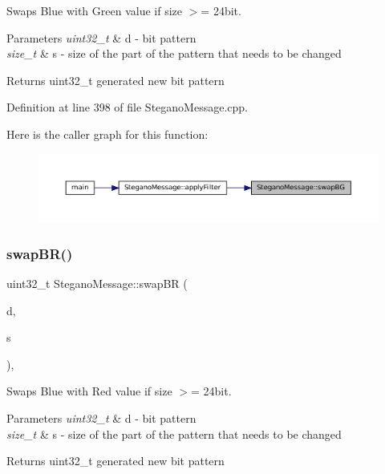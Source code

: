 Swaps Blue with Green value if size $>$= 24bit. 


\begin{DoxyParams}{Parameters}
{\em uint32\+\_\+t} & d -\/ bit pattern \\
\hline
{\em size\+\_\+t} & s -\/ size of the part of the pattern that needs to be changed \\
\hline
\end{DoxyParams}
\begin{DoxyReturn}{Returns}
uint32\+\_\+t generated new bit pattern 
\end{DoxyReturn}


Definition at line 398 of file Stegano\+Message.\+cpp.

Here is the caller graph for this function\+:
\nopagebreak
\begin{figure}[H]
\begin{center}
\leavevmode
\includegraphics[width=350pt]{classSteganoMessage_a06f64f5198cf180771dfe692125936be_icgraph}
\end{center}
\end{figure}
\mbox{\label{classSteganoMessage_a530e5ee67cf45ac56f8f3be4d2b44d2e}} 
\subsubsection{\texorpdfstring{swapBR()}{swapBR()}}
{\footnotesize\ttfamily uint32\+\_\+t Stegano\+Message\+::swap\+BR (\begin{DoxyParamCaption}\item[{uint32\+\_\+t}]{d,  }\item[{size\+\_\+t}]{s }\end{DoxyParamCaption})\hspace{0.3cm}{\ttfamily [static]}, {\ttfamily [private]}}



Swaps Blue with Red value if size $>$= 24bit. 


\begin{DoxyParams}{Parameters}
{\em uint32\+\_\+t} & d -\/ bit pattern \\
\hline
{\em size\+\_\+t} & s -\/ size of the part of the pattern that needs to be changed \\
\hline
\end{DoxyParams}
\begin{DoxyReturn}{Returns}
uint32\+\_\+t generated new bit pattern 
\end{DoxyReturn}


